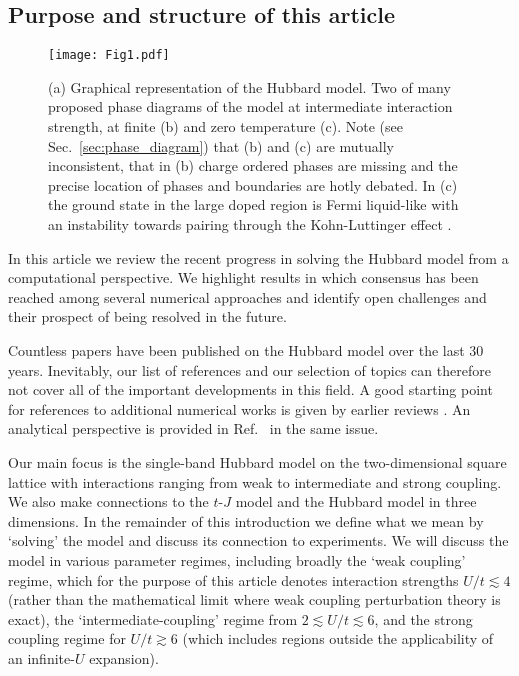 \documentclass{ar-1col}
\begin{document}
\subsection{Purpose and structure of this article}
 \begin{figure}[t!]
   \centering
  \texttt{[image: Fig1.pdf]}
   \caption{(a) Graphical representation of the Hubbard model. Two of many proposed phase diagrams of the model at intermediate interaction strength, at finite (b) and zero temperature (c). 
Note (see Sec.~\ref{sec:phase_diagram}) that (b) and (c) are mutually inconsistent, that in (b) charge ordered phases are missing and the precise location of phases and boundaries are hotly debated.
In (c) the ground state in the large doped region is Fermi liquid-like with an instability towards pairing through the Kohn-Luttinger effect \cite{Chubukov93}.    
   \label{fig:experiments}}
 \end{figure}
In this article we review the recent progress in solving the Hubbard model from a computational perspective. We highlight results in which consensus has been reached among several numerical approaches and identify open challenges and their prospect of being resolved in the future.

Countless papers have been published on the Hubbard model over the last $30$ years. Inevitably, our list of references and our selection of topics can therefore not cover all of the important developments in this field. A good starting point for references to additional numerical works is given by earlier reviews \cite{Dagotto94,Bulut02,Maier05A,Tremblay06,Scalapino07,Scalapino12}. An analytical perspective is provided in Ref.~\cite{Arovas21} in the same issue. 

Our main focus is the single-band Hubbard model on the two-dimensional square lattice with interactions ranging from weak to intermediate and strong coupling. We also make connections to the $t$-$J$ model and the Hubbard model in three dimensions. In the remainder of this introduction we define what we mean by `solving' the model and discuss its connection to experiments. 
We will discuss the model in various parameter regimes, including broadly the `weak coupling' regime, which for the purpose of this article denotes interaction strengths $U/t \lesssim 4$ (rather than the mathematical limit where weak coupling perturbation theory is exact), the `intermediate-coupling' regime from $2 \lesssim U/t \lesssim 6$, and the strong coupling regime for $U/t \gtrsim 6 $ (which includes regions outside the applicability of an infinite-$U$ expansion).\begin{marginnote}
\end{marginnote}
\end{document}
